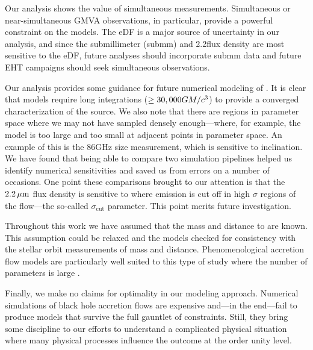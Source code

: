 Our analysis shows the value of simultaneous measurements.  Simultaneous or near-simultaneous GMVA observations, in particular, provide a powerful constraint on the models.  The eDF is a major source of uncertainty in our analysis, and since the submillimeter (submm) and 2.2\um flux density are most sensitive to the eDF, future analyses should incorporate submm data and future EHT campaigns should seek simultaneous observations.

Our analysis provides some guidance for future numerical modeling of \sgra.  It is clear that models require long integrations ($\ge 30,000 GM/c^3$) to provide a converged characterization of the source.  We also note that there are regions in parameter space where we may not have sampled densely enough---where, for example, the model is too large and too small at adjacent points in parameter space.  An example of this is the 86GHz size measurement, which is sensitive to inclination.  We have found that being able to compare two simulation pipelines helped us identify numerical sensitivities and saved us from errors on a number of occasions.  One point these comparisons brought to our attention is that the $2.2\,\mu\mathrm{m}$ flux density is sensitive to where emission is cut off in high $\sigma$ regions of the flow---the so-called $\sigma_\mathrm{cut}$ parameter.  This point merits future investigation.

Throughout this work we have assumed that the mass and distance to \sgra are known.  This assumption could be relaxed and the models checked for consistency with the stellar orbit measurements of mass and distance.  Phenomenological accretion flow models are particularly well suited to this type of study where the number of parameters is large  \citep[e.g.,]{2009ApJ...697...45B}.

Finally, we make no claims for optimality in our modeling approach.  Numerical simulations of black hole accretion flows are expensive and---in the end---fail to produce models that survive the full gauntlet of constraints.  Still, they bring some discipline to our efforts to understand a complicated physical situation where many physical processes influence the outcome at the order unity level.
